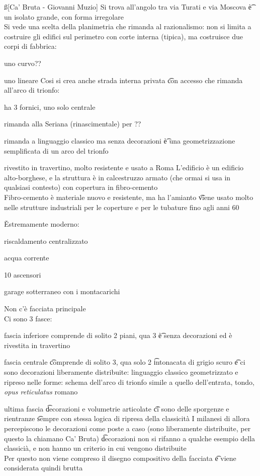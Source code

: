 \documentclass[12pt]{article}
\begin{document}
\ss[Ca' Bruta - Giovanni Muzio]
Si trova all'angolo tra via Turati e via Moscova \t è un isolato grande, con forma irregolare \\
Si vede una scelta della planimetria che rimanda al razionalismo: non si limita a costruire gli edifici sul perimetro con corte interna (tipica), ma costruisce due corpi di fabbrica:
\bi
  \item uno curvo??
  \item uno lineare
\ei
Cosi si crea anche strada interna privata \t con accesso che rimanda all'arco di trionfo:
\bi
  \item ha 3 fornici, uno solo centrale
  \item rimanda alla Seriana (rinascimentale) per ??
  \item rimanda a linguaggio classico ma senza decorazioni \t è una geometrizzazione semplificata di un arco del trionfo
  \item rivestito in travertino, molto resistente e usato a Roma
\ei
L'edificio è un edificio alto-borghese, e la struttura è in calcestruzzo armato (che ormai si usa in qualsiasi contesto) con copertura in fibro-cemento \\
Fibro-cemento è materiale nuovo e resistente, ma ha l'amianto \t viene usato molto nelle strutture industriali per le coperture e per le tubature fino agli anni 60 

\v

Estremamente moderno:
\bi
  \item riscaldamento centralizzato
  \item acqua corrente
  \item 10 ascensori
  \item garage sotterraneo con i montacarichi
\ei

Non c'è facciata principale \\
Ci sono 3 fasce:
\bi
  \item fascia inferiore comprende di solito 2 piani, qua 3 \t è senza decorazioni ed è rivestita in travertino
  \item fascia centrale \t comprende di solito 3, qua solo 2 \t intonacata di grigio scuro \t e ci sono decorazioni liberamente distribuite: linguaggio classico geometrizzato e ripreso nelle forme: schema dell'arco di trionfo simile a quello dell'entrata, tondo, \textit{opus reticulatus} romano
  \item ultima fascia \t decorazioni e volumetrie articolate \t ci sono delle sporgenze e rientranze \t sempre con stessa logica di ripresa della classicità
\ei
I milanesi di allora percepiscono le decorazioni come poste a caso (sono liberamente distribuite, per questo la chiamano Ca' Bruta) \t decorazioni non si rifanno a qualche esempio della classicià, e non hanno un criterio in cui vengono distribuite \\
Per questo non viene compreso il disegno compositivo della facciata \t e viene considerata quindi brutta
\end{document}
